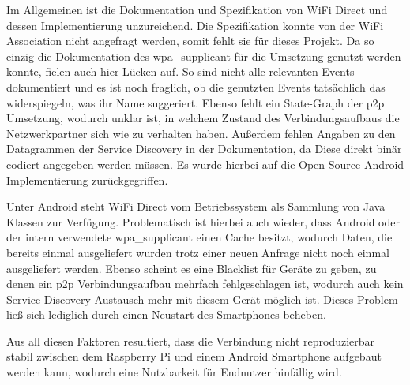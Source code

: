 		Im Allgemeinen ist die Dokumentation und Spezifikation von WiFi Direct und dessen Implementierung unzureichend. Die Spezifikation konnte von der WiFi Association nicht angefragt werden, somit fehlt sie für dieses Projekt. Da so einzig die Dokumentation des wpa\_supplicant für die Umsetzung genutzt werden konnte, fielen auch hier Lücken auf. So sind nicht alle relevanten Events dokumentiert und es ist noch fraglich, ob die genutzten Events tatsächlich das widerspiegeln, was ihr Name suggeriert. Ebenso fehlt ein State-Graph der p2p Umsetzung, wodurch unklar ist, in welchem Zustand des Verbindungsaufbaus die Netzwerkpartner sich wie zu verhalten haben. Außerdem fehlen Angaben zu den Datagrammen der Service Discovery in der Dokumentation, da Diese direkt binär codiert angegeben werden müssen. Es wurde hierbei auf die Open Source Android Implementierung zurückgegriffen.\cite{androidRepo}
		
		Unter Android steht WiFi Direct vom Betriebssystem als Sammlung von Java Klassen zur Verfügung. Problematisch ist hierbei auch wieder, dass Android oder der intern verwendete wpa\_supplicant einen Cache besitzt, wodurch Daten, die bereits einmal ausgeliefert wurden trotz einer neuen Anfrage nicht noch einmal ausgeliefert werden. Ebenso scheint es eine Blacklist für Geräte zu geben, zu denen ein p2p Verbindungsaufbau mehrfach fehlgeschlagen ist, wodurch auch kein Service Discovery Austausch mehr mit diesem Gerät möglich ist. Dieses Problem ließ sich lediglich durch einen Neustart des Smartphones beheben.
		
		Aus all diesen Faktoren resultiert, dass die Verbindung nicht reproduzierbar stabil zwischen dem Raspberry Pi und einem Android Smartphone aufgebaut werden kann, wodurch eine Nutzbarkeit für Endnutzer hinfällig wird.